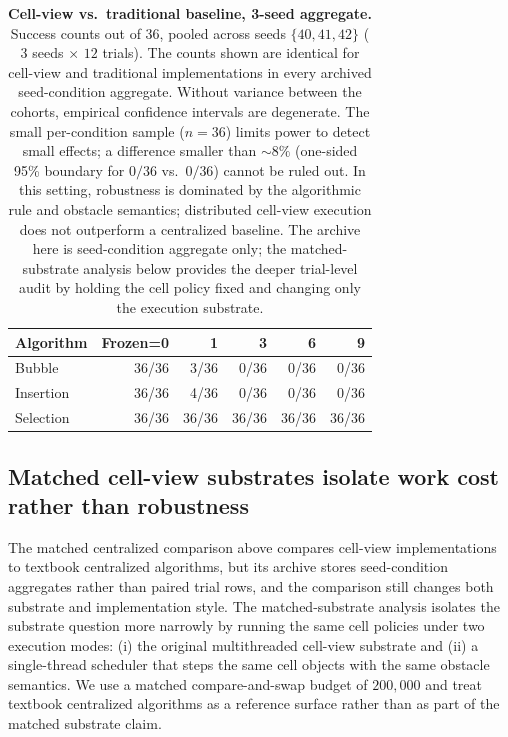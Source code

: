 \documentclass[11pt]{article}
\begin{document}
\begin{table}[t]
  \centering
  \small
  \setlength{\tabcolsep}{4pt}
  \begin{tabular}{@{}lrrrrr@{}}
    \toprule
    Algorithm & Frozen=0 & 1 & 3 & 6 & 9 \\
    \midrule
    Bubble & 36/36 & 3/36 & 0/36 & 0/36 & 0/36 \\
    Insertion & 36/36 & 4/36 & 0/36 & 0/36 & 0/36 \\
    Selection & 36/36 & 36/36 & 36/36 & 36/36 & 36/36 \\
    \bottomrule
  \end{tabular}
  \caption{\textbf{Cell-view vs.\ traditional baseline, 3-seed aggregate.}
  Success counts out of $36$, pooled across seeds $\{40,41,42\}$ ($3$ seeds $\times$ $12$ trials).
  The counts shown are identical for cell-view and traditional implementations in every archived
  seed-condition aggregate.
  Without variance between the cohorts, empirical confidence intervals are degenerate.
  The small per-condition sample ($n=36$) limits power to detect small effects;
  a difference smaller than ${\sim}8\%$ (one-sided 95\% boundary for $0/36$ vs.\ $0/36$)
  cannot be ruled out. In this setting, robustness is dominated by the algorithmic
  rule and obstacle semantics; distributed cell-view execution does not outperform a centralized
  baseline. The archive here is seed-condition aggregate only; the matched-substrate analysis below provides the deeper
  trial-level audit by holding the cell policy fixed and changing only the execution substrate.}
  \label{tab:exp14}
\end{table}

\subsection{Matched cell-view substrates isolate work cost rather than robustness}
The matched centralized comparison above compares cell-view implementations to textbook centralized algorithms, but its archive stores
seed-condition aggregates rather than paired trial rows, and the comparison still changes
both substrate and implementation style. The matched-substrate analysis isolates the substrate question more narrowly by
running the same cell policies under two execution modes:
(i) the original multithreaded cell-view substrate and
(ii) a single-thread scheduler that steps the same cell objects with the same obstacle semantics.
We use a matched compare-and-swap budget of $200{,}000$ and treat textbook centralized algorithms as
a reference surface rather than as part of the matched substrate claim.
\end{document}
